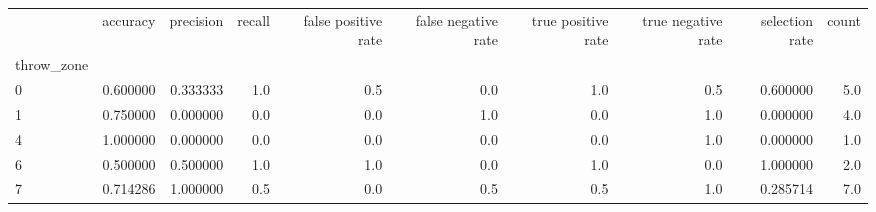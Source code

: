 \begin{tabular}{lrrrrrrrrr}
\toprule
{} &  accuracy &  precision &  recall &  false positive rate &  false negative rate &  true positive rate &  true negative rate &  selection rate &  count \\
throw\_zone &           &            &         &                      &                      &                     &                     &                 &        \\
\midrule
0          &  0.600000 &   0.333333 &     1.0 &                  0.5 &                  0.0 &                 1.0 &                 0.5 &        0.600000 &    5.0 \\
1          &  0.750000 &   0.000000 &     0.0 &                  0.0 &                  1.0 &                 0.0 &                 1.0 &        0.000000 &    4.0 \\
4          &  1.000000 &   0.000000 &     0.0 &                  0.0 &                  0.0 &                 0.0 &                 1.0 &        0.000000 &    1.0 \\
6          &  0.500000 &   0.500000 &     1.0 &                  1.0 &                  0.0 &                 1.0 &                 0.0 &        1.000000 &    2.0 \\
7          &  0.714286 &   1.000000 &     0.5 &                  0.0 &                  0.5 &                 0.5 &                 1.0 &        0.285714 &    7.0 \\
\bottomrule
\end{tabular}
